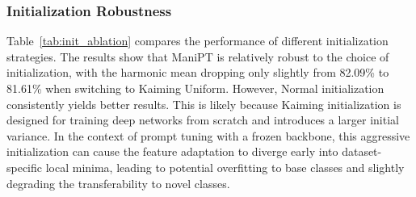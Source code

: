 \documentclass{article}
\theoremstyle{plain}
\theoremstyle{definition}
\theoremstyle{remark}
\begin{document}
	\subsubsection{Initialization Robustness}
	\begin{table}[h]
		\caption{Ablation study on initialization strategies. We compare the Normal initialization with Kaiming Uniform initialization. The results indicate that ManiPT is relatively robust to initialization strategies, though Normal initialization yields slightly better performance by avoiding excessive initial variance.}
		\label{tab:init_ablation}
		\centering
	\end{table}
	Table~\ref{tab:init_ablation} compares the performance of different initialization strategies. The results show that ManiPT is relatively robust to the choice of initialization, with the harmonic mean dropping only slightly from 82.09\% to 81.61\% when switching to Kaiming Uniform. However, Normal initialization consistently yields better results. This is likely because Kaiming initialization is designed for training deep networks from scratch and introduces a larger initial variance. In the context of prompt tuning with a frozen backbone, this aggressive initialization can cause the feature adaptation to diverge early into dataset-specific local minima, leading to potential overfitting to base classes and slightly degrading the transferability to novel classes.
\end{document}
